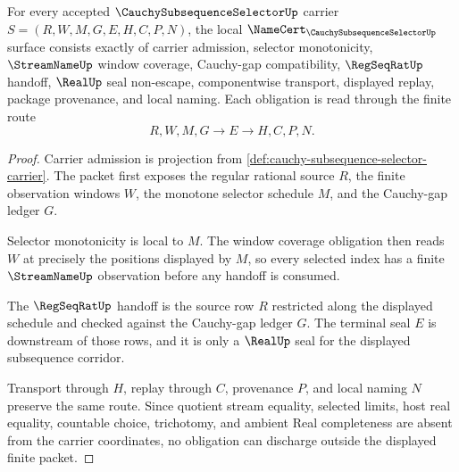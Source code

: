 \begin{theorem}
\label{thm:cauchy-subsequence-selector-namecert-obligations}
For every accepted $\CauchySubsequenceSelectorUp$ carrier $S=(R,W,M,G,E,H,C,P,N)$, the local $\NameCert_{\CauchySubsequenceSelectorUp}$ surface consists exactly of carrier admission, selector monotonicity, $\StreamNameUp$ window coverage, Cauchy-gap compatibility, $\RegSeqRatUp$ handoff, $\RealUp$ seal non-escape, componentwise transport, displayed replay, package provenance, and local naming. Each obligation is read through the finite route
$$
R,W,M,G \longrightarrow E \longrightarrow H,C,P,N .
$$
\end{theorem}
\begin{proof}
Carrier admission is projection from \autoref{def:cauchy-subsequence-selector-carrier}. The packet first exposes the regular rational source $R$, the finite observation windows $W$, the monotone selector schedule $M$, and the Cauchy-gap ledger $G$.

Selector monotonicity is local to $M$. The window coverage obligation then reads $W$ at precisely the positions displayed by $M$, so every selected index has a finite $\StreamNameUp$ observation before any handoff is consumed.

The $\RegSeqRatUp$ handoff is the source row $R$ restricted along the displayed schedule and checked against the Cauchy-gap ledger $G$. The terminal seal $E$ is downstream of those rows, and it is only a $\RealUp$ seal for the displayed subsequence corridor.

Transport through $H$, replay through $C$, provenance $P$, and local naming $N$ preserve the same route. Since quotient stream equality, selected limits, host real equality, countable choice, trichotomy, and ambient Real completeness are absent from the carrier coordinates, no obligation can discharge outside the displayed finite packet.
\end{proof}

